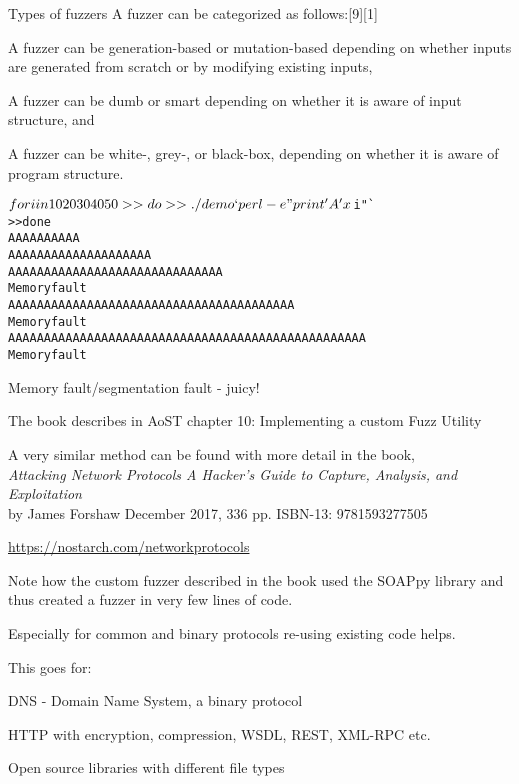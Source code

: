 \documentclass[Screen16to9,17pt]{foils}
\begin{document}
Types of fuzzers
A fuzzer can be categorized as follows:[9][1]
\begin{list2}
\item A fuzzer can be generation-based or mutation-based depending on whether inputs are generated from scratch or by modifying existing inputs,
\item A fuzzer can be dumb or smart depending on whether it is aware of input structure, and
\item A fuzzer can be white-, grey-, or black-box, depending on whether it is aware of program structure.
\end{list2}



\begin{alltt}
$ for i in 10 20 30 40 50
>> do
>> ./demo `perl -e "print 'A'x$i"`
>> done
AAAAAAAAAA
AAAAAAAAAAAAAAAAAAAA
AAAAAAAAAAAAAAAAAAAAAAAAAAAAAA
Memory fault
AAAAAAAAAAAAAAAAAAAAAAAAAAAAAAAAAAAAAAAA
Memory fault
AAAAAAAAAAAAAAAAAAAAAAAAAAAAAAAAAAAAAAAAAAAAAAAAAA
Memory fault
\end{alltt}

\centerline{Memory fault/segmentation fault - juicy!}




The book describes in AoST chapter 10: Implementing a custom Fuzz Utility

A very similar method can be found with more detail in the book,\\
\emph{Attacking Network Protocols A Hacker's Guide to Capture, Analysis, and Exploitation}\\
by James Forshaw December 2017, 336 pp. ISBN-13: 9781593277505

\url{https://nostarch.com/networkprotocols}



Note how the custom fuzzer described in the book used the SOAPpy library and thus created a fuzzer in very few lines of code.

Especially for common and binary protocols re-using existing code helps.

This goes for:
\begin{list2}
\item DNS - Domain Name System, a binary protocol
\item HTTP with encryption, compression, WSDL, REST, XML-RPC etc.
\item Open source libraries with different file types
\end{list2}
\end{document}
